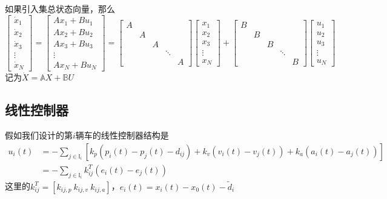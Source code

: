 如果引入集总状态向量，那么
\begin{equation}
\begin{bmatrix}
\dot{x} _{1} \\
\dot{x} _{2} \\
\dot{x} _{3} \\
\vdots  \\
\dot{x} _{N}
\end{bmatrix}=\begin{bmatrix}
Ax _{1}+Bu_{1} \\
Ax _{2}+Bu_{2}\\
Ax _{3}+Bu_{3} \\
\vdots  \\
Ax _{N}+Bu_{N}
\end{bmatrix}=\begin{bmatrix}
 A &  &  &  & \\
  & A &  &  & \\
  &  & A &  & \\
  &  &  & \ddots  & \\
  &  &  &  &A
\end{bmatrix}\begin{bmatrix}
x _{1} \\
x _{2}\\
x _{3} \\
\vdots  \\
x _{N}
\end{bmatrix}+\begin{bmatrix}
 B &  &  &  & \\
  & B &  &  & \\
  &  & B &  & \\
  &  &  & \ddots  & \\
  &  &  &  &B
\end{bmatrix}\begin{bmatrix}
u _{1} \\
u _{2}\\
u _{3} \\
\vdots  \\
u _{N}
\end{bmatrix}
\end{equation}
记为$\dot{X} =\mathbb{A} X+\mathbb{B} U$

\subsection {线性控制器}
假如我们设计的第$i$辆车的线性控制器结构是
\begin{equation}
\begin{aligned}u_{i}(t)&=-\sum_{j\in \mathbb{I}_{i} }^{} [k_{p}(p_{i}(t)-p_{j}(t)-d_{ij})+k_{v}(v_{i}(t)-v_{j}(t))+k_{a}(a_{i}(t)-a_{j}(t))]\\
&=-\sum_{j\in \mathbb{I}_{i} }^{}k_{ij}^T(e _{i}(t)-e_{j}(t))
\end{aligned}
\end{equation}
这里的$k_{ij}^T=[k_{ij,p}\ k_{ij,v}\ k_{ij,a}]$，$e _{i}(t)=x_{i}(t)-x_{0}(t)-\tilde{d} _{i}$


